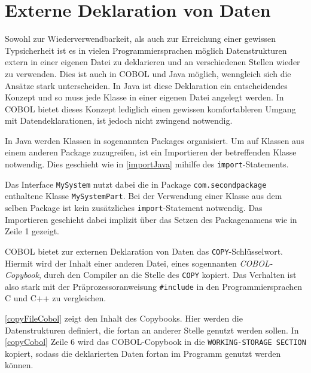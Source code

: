 \section{Externe Deklaration von Daten} 
  
Sowohl zur Wiederverwendbarkeit, als auch zur Erreichung einer gewissen Typsicherheit ist es in vielen Programmiersprachen möglich Datenstrukturen extern in einer eigenen Datei zu deklarieren und an verschiedenen Stellen wieder zu verwenden. Dies ist auch in COBOL und Java möglich, wenngleich sich die Ansätze stark unterscheiden. In Java ist diese Deklaration ein entscheidendes Konzept und so muss jede Klasse in einer eigenen Datei angelegt werden. In COBOL bietet dieses Konzept lediglich einen gewissen komfortableren Umgang mit Datendeklarationen, ist jedoch nicht zwingend notwendig.

In Java werden Klassen in sogenannten Packages organisiert. Um auf Klassen aus einem anderen Package zuzugreifen, ist ein Importieren der betreffenden Klasse notwendig. Dies geschieht wie in \autoref{importJava} mihilfe des \texttt{import}-Statements.

Das Interface \texttt{MySystem} nutzt dabei die in Package \texttt{com.secondpackage} enthaltene Klasse \texttt{MySystemPart}. Bei der Verwendung einer Klasse aus dem selben Package ist kein zusätzliches \texttt{import}-Statement notwendig. Das Importieren geschieht dabei implizit über das Setzen des Packagenamens wie in Zeile 1 gezeigt.

COBOL bietet zur externen Deklaration von Daten das \texttt{COPY}-Schlüsselwort. Hiermit wird der Inhalt einer anderen Datei, eines sogennanten \textit{COBOL-Copybook}, durch den Compiler an die Stelle des \texttt{COPY} kopiert. Das Verhalten ist also stark mit der Präprozessoranweisung \texttt{#include} in den Programmiersprachen C und C++ zu vergleichen.

\autoref{copyFileCobol} zeigt den Inhalt des Copybooks. Hier werden die Datenstrukturen definiert, die fortan an anderer Stelle genutzt werden sollen. In \autoref{copyCobol} Zeile 6 wird das COBOL-Copybook in die \texttt{WORKING-STORAGE SECTION} kopiert, sodass die deklarierten Daten fortan im Programm genutzt werden können.

